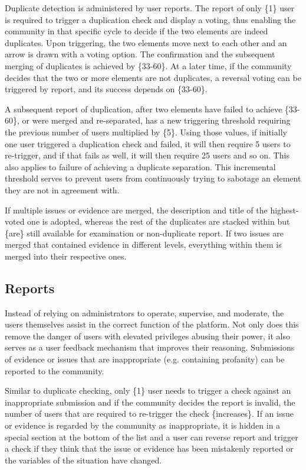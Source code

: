 \documentclass[a4paper,11pt]{article}
\begin{document}
\begin{multicols}{2}
Duplicate detection is administered by user reports. The report of only \{1\} user is required to trigger a duplication check and display a voting, thus enabling the community in that specific cycle to decide if the two elements are indeed duplicates. Upon triggering, the two elements move next to each other and an arrow is drawn with a voting option. The confirmation and the subsequent merging of duplicates is achieved by \{33-60\}. At a later time, if the community decides that the two or more elements are not duplicates, a reversal voting can be triggered by report, and its success depends on \{33-60\}.

A subsequent report of duplication, after two elements have failed to achieve \{33-60\}, or were merged and re-separated, has a new triggering threshold requiring the previous number of users multiplied by \{5\}. Using those values, if initially one user triggered a duplication check and failed, it will then require 5 users to re-trigger, and if that fails as well, it will then require 25 users and so on. This also applies to failure of achieving a duplicate separation. This incremental threshold serves to prevent users from continuously trying to sabotage an element they are not in agreement with.

If multiple issues or evidence are merged, the description and title of the highest-voted one is adopted, whereas the rest of the duplicates are stacked within but \{are\} still available for examination or non-duplicate report. If two issues are merged that contained evidence in different levels, everything within them is merged into their respective ones.

\subsection{Reports} \label{reports}

Instead of relying on administrators to operate, supervise, and moderate, the users themselves assist in the correct function of the platform. Not only does this remove the danger of users with elevated privileges abusing their power, it also serves as a user feedback mechanism that improves their reasoning. Submissions of evidence or issues that are inappropriate (e.g. containing profanity) can be reported to the community.

Similar to duplicate checking, only \{1\} user needs to trigger a check against an inappropriate submission and if the community decides the report is invalid, the number of users that are required to re-trigger the check \{increases\}. If an issue or evidence is regarded by the community as inappropriate, it is hidden in a special section at the bottom of the list and a user can reverse report and trigger a check if they think that the issue or evidence has been mistakenly reported or the variables of the situation have changed.


\end{multicols}
\end{document}
